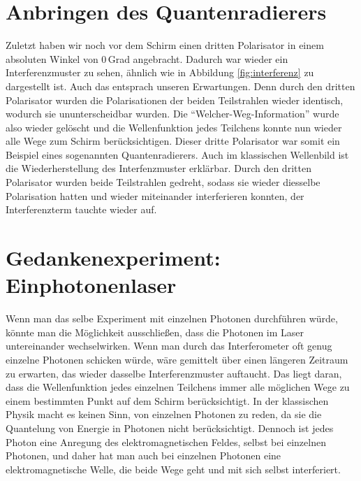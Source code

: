 \documentclass[a4paper,ngerman]{scrartcl}
\begin{document}
\section{Anbringen des Quantenradierers}
Zuletzt haben wir noch vor dem Schirm einen dritten Polarisator in einem absoluten Winkel von 0\,Grad angebracht. 
Dadurch war wieder ein Interferenzmuster zu sehen, ähnlich wie in Abbildung \ref{fig:interferenz} zu dargestellt ist. Auch das entsprach unseren Erwartungen. Denn durch den dritten Polarisator wurden die Polarisationen der beiden Teilstrahlen wieder identisch, wodurch sie ununterscheidbar wurden.
Die "`Welcher-Weg-Information"' wurde also wieder gelöscht und die Wellenfunktion jedes Teilchens konnte nun wieder alle Wege zum Schirm berücksichtigen. Dieser dritte Polarisator war somit ein Beispiel eines sogenannten Quantenradierers. Auch im klassischen Wellenbild 
ist die Wiederherstellung des Interfenzmuster erklärbar. Durch den dritten Polarisator wurden beide Teilstrahlen gedreht, sodass sie wieder diesselbe Polarisation hatten und wieder miteinander interferieren konnten, der Interferenzterm tauchte wieder auf.

\section{Gedankenexperiment: Einphotonenlaser}
Wenn man das selbe Experiment mit einzelnen Photonen durchführen würde, könnte man die Möglichkeit ausschließen, dass die Photonen im Laser
untereinander wechselwirken. Wenn man durch das Interferometer oft genug einzelne Photonen schicken würde, wäre gemittelt über einen 
längeren Zeitraum zu erwarten, das wieder dasselbe Interferenzmuster auftaucht. Das liegt daran, dass die Wellenfunktion jedes einzelnen Teilchens immer alle möglichen Wege zu einem bestimmten Punkt auf dem Schirm berücksichtigt. In der klassischen Physik macht es keinen Sinn, von einzelnen Photonen zu reden, da sie die Quantelung von Energie in Photonen nicht berücksichtigt. Dennoch ist jedes Photon eine Anregung des elektromagnetischen Feldes, selbst bei einzelnen Photonen, und daher hat man auch bei einzelnen Photonen eine elektromagnetische Welle, die beide Wege geht und mit sich selbst interferiert.
\end{document}
